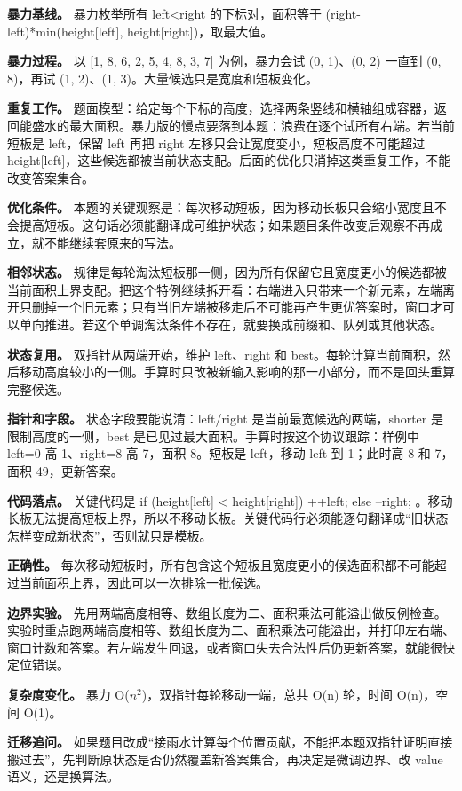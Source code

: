 \textbf{暴力基线。} 暴力枚举所有 left<right 的下标对，面积等于 (right-left)*min(height[left], height[right])，取最大值。

\textbf{暴力过程。} 以 [1, 8, 6, 2, 5, 4, 8, 3, 7] 为例，暴力会试 (0, 1)、(0, 2) 一直到 (0, 8)，再试 (1, 2)、(1, 3)。大量候选只是宽度和短板变化。

\textbf{重复工作。} 题面模型：给定每个下标的高度，选择两条竖线和横轴组成容器，返回能盛水的最大面积。暴力版的慢点要落到本题：浪费在逐个试所有右端。若当前短板是 left，保留 left 再把 right 左移只会让宽度变小，短板高度不可能超过 height[left]，这些候选都被当前状态支配。后面的优化只消掉这类重复工作，不能改变答案集合。

\textbf{优化条件。} 本题的关键观察是：每次移动短板，因为移动长板只会缩小宽度且不会提高短板。这句话必须能翻译成可维护状态；如果题目条件改变后观察不再成立，就不能继续套原来的写法。

\textbf{相邻状态。} 规律是每轮淘汰短板那一侧，因为所有保留它且宽度更小的候选都被当前面积上界支配。把这个特例继续拆开看：右端进入只带来一个新元素，左端离开只删掉一个旧元素；只有当旧左端被移走后不可能再产生更优答案时，窗口才可以单向推进。若这个单调淘汰条件不存在，就要换成前缀和、队列或其他状态。

\textbf{状态复用。} 双指针从两端开始，维护 left、right 和 best。每轮计算当前面积，然后移动高度较小的一侧。手算时只改被新输入影响的那一小部分，而不是回头重算完整候选。

\textbf{指针和字段。} 状态字段要能说清：left/right 是当前最宽候选的两端，shorter 是限制高度的一侧，best 是已见过最大面积。手算时按这个协议跟踪：样例中 left=0 高 1、right=8 高 7，面积 8。短板是 left，移动 left 到 1；此时高 8 和 7，面积 49，更新答案。

\textbf{代码落点。} 关键代码是 if (height[left] < height[right]) ++left; else --right; 。移动长板无法提高短板上界，所以不移动长板。关键代码行必须能逐句翻译成“旧状态怎样变成新状态”，否则就只是模板。

\textbf{正确性。} 每次移动短板时，所有包含这个短板且宽度更小的候选面积都不可能超过当前面积上界，因此可以一次排除一批候选。

\textbf{边界实验。} 先用两端高度相等、数组长度为二、面积乘法可能溢出做反例检查。实验时重点跑两端高度相等、数组长度为二、面积乘法可能溢出，并打印左右端、窗口计数和答案。若左端发生回退，或者窗口失去合法性后仍更新答案，就能很快定位错误。

\textbf{复杂度变化。} 暴力 O(\ensuremath{n^{2}})，双指针每轮移动一端，总共 O(n) 轮，时间 O(n)，空间 O(1)。

\textbf{迁移追问。} 如果题目改成“接雨水计算每个位置贡献，不能把本题双指针证明直接搬过去”，先判断原状态是否仍然覆盖新答案集合，再决定是微调边界、改 value 语义，还是换算法。

